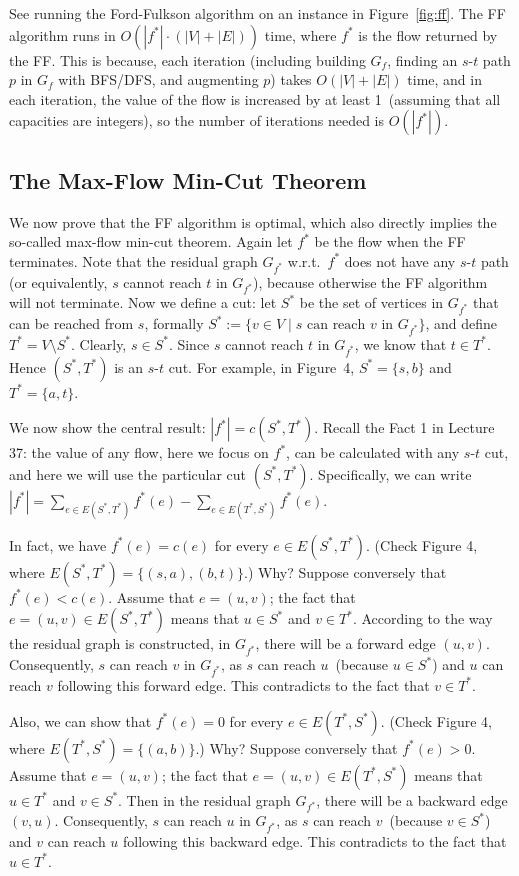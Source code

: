 \documentclass[letterpaper,11pt]{article}
\theoremstyle{mytheorem}
\begin{document}
See running the Ford-Fulkson algorithm on an instance in Figure~\ref{fig:ff}.
The FF algorithm runs in $O(|f^*|\cdot(|V|+|E|))$ time,
where $f^*$ is the flow returned by the FF. 
This is because, each iteration (including building $G_f$, finding an $s$-$t$ path $p$ in $G_f$
with BFS/DFS, and augmenting $p$) takes $O(|V|+|E|)$ time, and in each iteration,
the value of the flow is increased by at least 1~(assuming that all capacities are integers),
so the number of iterations needed is $O(|f^*|)$.


\subsection*{The Max-Flow Min-Cut Theorem}

We now prove that the FF algorithm is optimal, which also directly implies the so-called max-flow min-cut
theorem.  Again let $f^*$ be the flow when the FF terminates. Note that the residual graph $G_{f^*}$ w.r.t.\ $f^*$ does
not have any $s$-$t$ path (or equivalently, $s$ cannot reach $t$ in $G_{f^*}$), because otherwise the FF algorithm will
not terminate. Now we define a cut: let $S^*$ be the set of vertices in  $G_{f^*}$ that can be reached from $s$, formally 
$S^* := \{v\in V\mid s \textrm{ can reach $v$ in } G_{f^*} \}$,
and define $T^* = V\setminus S^*$.
Clearly, $s\in S^*$.  Since $s$ cannot reach $t$ in $G_{f^*}$, we know that $t\in T^*$. Hence
$(S^*, T^*)$ is an $s$-$t$ cut. For example, in Figure~4, $S^* = \{s,b\}$ and $T^* = \{a,t\}$.

We now show the central result: $|f^*| = c(S^*,T^*)$. Recall the Fact 1 in Lecture
37: the value of any flow, here we focus on $f^*$, can be calculated with any $s$-$t$
cut, and here we will use the particular cut $(S^*,T^*)$.
Specifically, we can write $|f^*| = \sum_{e\in E(S^*, T^*)} f^*(e) - \sum_{e\in E(T^*, S^*)} f^*(e)$.

In fact, we have $f^*(e) = c(e)$ for every $e \in E(S^*,T^*)$. (Check Figure 4, where
$E(S^*,T^*) = \{(s,a),(b,t)\}$.) Why? Suppose conversely that $f^*(e) < c(e)$.
Assume that $e = (u,v)$; the fact that $e = (u,v) \in E(S^*,T^*)$
means that $u \in S^*$ and $v \in T^*$. According to the way the residual graph is constructed, in $G_{f^*}$, there will be
a forward edge $(u,v)$. Consequently, $s$ can reach $v$ in $G_{f^*}$, as $s$ can reach $u$~(because $u\in S^*$) and $u$ can reach 
$v$ following this forward edge. This contradicts to the fact that $v \in T^*$.

Also, we can show that $f^*(e) = 0$ for every $e \in E(T^*,S^*)$. (Check Figure 4, where $E(T^*,S^*) = \{(a,b)\}$.)
Why? Suppose conversely that $f^*(e)>0$. Assume that $e=(u,v)$; the fact that $e=(u,v) \in E(T^*,S^*)$ means
that $u \in T^*$ and $v\in S^*$. Then in the residual graph $G_{f^*}$, there will be a backward edge 
$(v, u)$. Consequently, $s$ can reach $u$ in $G_{f^*}$, as $s$ can reach $v$~(because $v\in S^*$) and $v$ can reach $u$ following this backward edge. 
This contradicts to the fact that $u \in T^*$.
\end{document}
